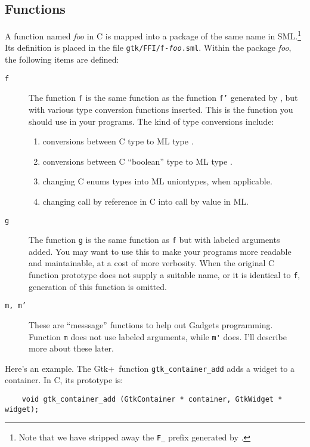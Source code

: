 \documentclass{article}
\newcommand{\gtk}{\mbox{\sf Gtk+}}
\begin{document}
\subsection{Functions}

   A function named {\em foo} in C is mapped into a package of the same name 
in SML.\footnote{Note that we have stripped away the {\tt F\_} prefix
generated by \mlnlffigen.}  
Its definition is placed in the file {\tt gtk/FFI/f-{\em foo}.sml}.
Within the package {\em foo}, the following items are defined:
   \begin{description} 
    \item[\tt f] The function {\tt f} is the same function as 
         the function {\tt f'} generated by \mlnlffigen, but
         with various type conversion functions inserted.  This is 
         the function you should use in your programs.
         The kind of type conversions include:
        \begin{enumerate}
          \item conversions between C type  to 
                ML type .
          \item conversions between C ``boolean'' type to ML type .
          \item changing C enums types into ML uniontypes, when applicable.
          \item changing call by reference in C into call by value in ML.
         \end{enumerate}
    \item[\tt g] The function {\tt g} is the same function as {\tt f}
         but with labeled arguments added.  You may want to use this
         to make your programs more readable and maintainable, at a cost
         of more verbosity.
         When the original C function prototype does not supply a suitable name,
         or it is identical to {\tt f}, generation of this function is omitted.
    \item[\tt m, m'] These are ``messsage'' functions to help
out Gadgets programming.  Function \verb|m| does not use labeled arguments,
while \verb|m'| does.  I'll describe more about these later.
  \end{description}

   Here's an example.  The \gtk\ function \verb|gtk_container_add| adds
a widget to a container.  In C, its prototype is:
\begin{verbatim}
    void gtk_container_add (GtkContainer * container, GtkWidget * widget);
\end{verbatim}
\end{document}
